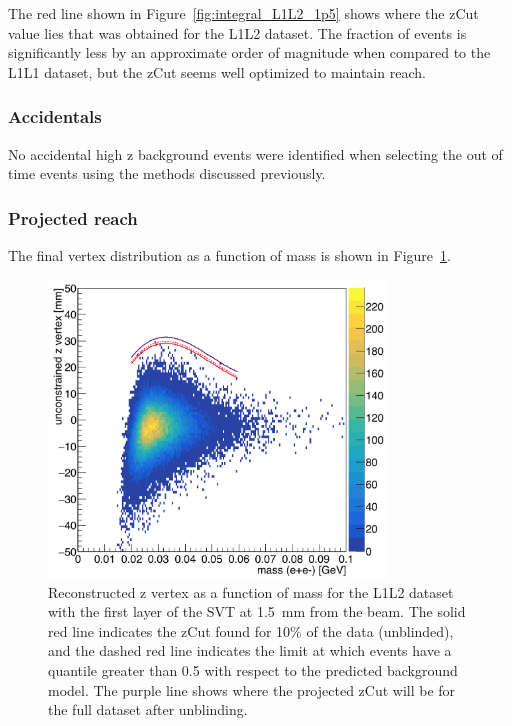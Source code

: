 \documentclass[twoside]{article}
\begin{document}
The red line shown in Figure~\ref{fig:integral_L1L2_1p5} shows where the zCut value lies that was obtained for the L1L2 dataset. The fraction of events is significantly less by an approximate order of magnitude when compared to the L1L1 dataset, but the zCut seems well optimized to maintain reach.

\subsubsection{Accidentals}

No accidental high z background events were identified when selecting the out of time events using the methods discussed previously. 

\subsubsection{Projected reach}

The final vertex distribution as a function of mass is shown in Figure~\ref{fig:zVm_L1L2_1p5}. 
\begin{figure}[H]
  \centering
     \includegraphics[width=0.8\textwidth]{plots/zVm_L1L2_1p5.png}
  \caption{Reconstructed z vertex as a function of mass for the L1L2 dataset with the first layer of the SVT at 1.5~mm from the beam. The solid red line indicates the zCut found for 10$\%$ of the data (unblinded), and the dashed red line indicates the limit at which events have a quantile greater than 0.5 with respect to the predicted background model. The purple line shows where the projected zCut will be for the full dataset after unblinding.}
  \label{fig:zVm_L1L2_1p5}
\end{figure} 
\end{document}
